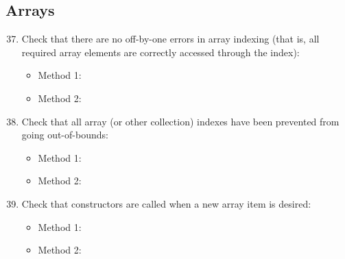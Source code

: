 \subsection{Arrays}
\begin{enumerate}
	\setcounter{enumi}{36}
	\item Check that there are no off-by-one errors in array indexing (that is, all required array elements are correctly accessed through the index):
	\begin{itemize}
		\item Method 1: \cmark
		\item Method 2: \cmark
	\end{itemize}
	\item Check that all array (or other collection) indexes have been prevented from going out-of-bounds:
	\begin{itemize}
		\item Method 1: \cmark
		\item Method 2: \cmark
	\end{itemize}
	\item Check that constructors are called when a new array item is desired:
	\begin{itemize}
		\item Method 1: \cmark
		\item Method 2: \cmark
	\end{itemize}
\end{enumerate}